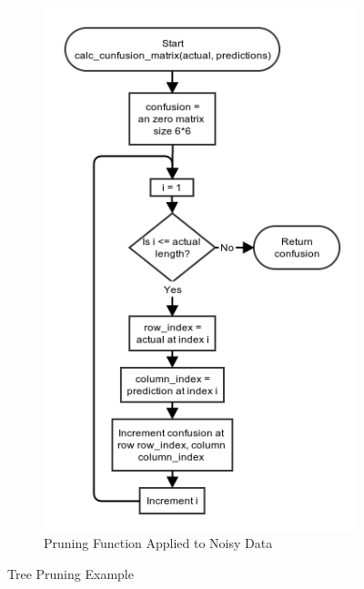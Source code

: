 \documentclass[11pt,a4paper]{article}
\begin{document}
\begin{figure}[!ht]
	\begin{subfigure}[b]{0.495\textwidth}
		\includegraphics[width=\textwidth]{images/flow_chart/calc_confusion_matrix.png}
     	\caption{Pruning Function Applied to Noisy Data}
     	\label{fig:pruningNoisy}
    \end{subfigure}
    \caption{Tree Pruning Example}
    \label{fig:pruning}
\end{figure}
\end{document}
